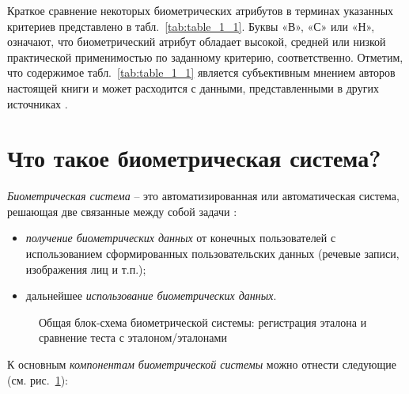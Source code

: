 \documentclass[12pt]{book}
\begin{document}
\large{Краткое сравнение некоторых биометрических атрибутов в терминах указанных критериев представлено в табл.~\ref{tab:table_1_1}. Буквы «В», «С» или «Н», означают, что биометрический атрибут обладает высокой, средней или низкой практической применимостью по заданному критерию, соответственно. Отметим, что содержимое табл.~\ref{tab:table_1_1} является субъективным мнением авторов настоящей книги и может расходится с данными, представленными в других источниках \cite{tripathi_2011, dahea_2018, rousan_2020}.}

\section{Что такое биометрическая система?}

\large{\textit{Биометрическая система} -- это автоматизированная или автоматическая система, решающая две связанные между собой задачи \cite{kukharev_2013}: 

\begin{itemize}[topsep=1pt] \itemsep0.1em
\item \textit{получение биометрических данных} от конечных пользователей с использованием сформированных пользовательских данных (речевые записи, изображения лиц и т.п.);
\item дальнейшее \textit{использование биометрических данных}.
\end{itemize}

\begin{figure}[h]
\caption{Общая блок-схема биометрической системы: регистрация эталона и сравнение теста с эталоном/эталонами}
\label{fig:figure_1_1}
\end{figure}

К основным \textit{компонентам биометрической системы} можно отнести следующие (см. рис.~\ref{fig:figure_1_1}): 

}
\end{document}
